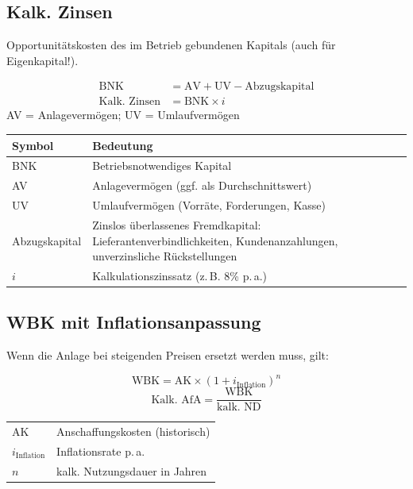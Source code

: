 \documentclass[10pt,a4paper]{article}
\begin{document}
\begin{multicols}{2}
\subsection{Kalk. Zinsen}

Opportunitätskosten des im Betrieb gebundenen Kapitals (auch für Eigenkapital!).

\begin{formelbox}
\begin{align*}
\text{BNK} &= \text{AV} + \text{UV} - \text{Abzugskapital}\\
\text{Kalk. Zinsen} &= \text{BNK} \times i
\end{align*}
\footnotesize AV = Anlagevermögen; UV = Umlaufvermögen
\end{formelbox}

\begin{tabular}{|L{2.5cm}|L{4.5cm}|}
\hline
{}
\textbf{Symbol} & \textbf{Bedeutung} \\
\hline
BNK & Betriebsnotwendiges Kapital \\
AV & Anlagevermögen (ggf. als Durchschnittswert) \\
UV & Umlaufvermögen (Vorräte, Forderungen, Kasse) \\
Abzugskapital & Zinslos überlassenes Fremdkapital: Lieferantenverbindlichkeiten, Kundenanzahlungen, unverzinsliche Rückstellungen \\
$i$ & Kalkulationszinssatz (z.\,B. 8\% p.\,a.) \\
\hline
\end{tabular}

\columnbreak

\subsection{WBK mit Inflationsanpassung}

Wenn die Anlage bei steigenden Preisen ersetzt werden muss, gilt:

\begin{formelbox}
\[
\text{WBK} = \text{AK} \times \left(1 + i_{\text{Inflation}}\right)^{n} %
\]
\[
\text{Kalk. AfA} = \frac{\text{WBK}}{\text{kalk. ND}}
\]
\end{formelbox}

\begin{tabular}{|L{2.5cm}|L{4.5cm}|}
\hline
{}
AK & Anschaffungskosten (historisch) \\
$i_{\text{Inflation}}$ & Inflationsrate p.\,a. \\
$n$ & kalk. Nutzungsdauer in Jahren \\
\hline
\end{tabular}


\end{multicols}
\end{document}
